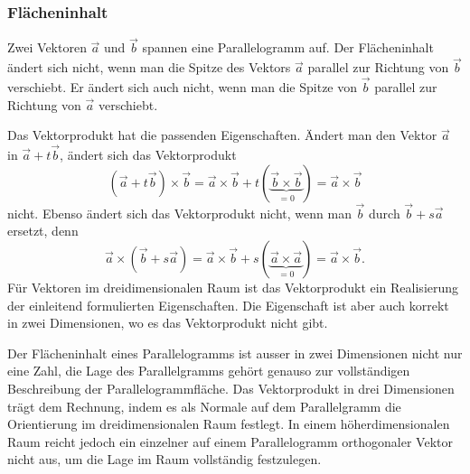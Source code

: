 %
%
\subsubsection{Flächeninhalt}

Zwei Vektoren $\vec{a}$ und $\vec{b}$ spannen eine Parallelogramm auf.
Der Flächeninhalt ändert sich nicht, wenn man die Spitze des Vektors
$\vec{a}$ parallel zur Richtung von $\vec{b}$ verschiebt.
Er ändert sich auch nicht, wenn man die Spitze von $\vec{b}$ parallel
zur Richtung von $\vec{a}$ verschiebt.

Das Vektorprodukt hat die passenden Eigenschaften.
Ändert man den Vektor $\vec{a}$ in $\vec{a}+t\vec{b}$, ändert sich das
Vektorprodukt
\begin{equation}
(\vec{a}+t\vec{b})\times\vec{b}
=
\vec{a}\times\vec{b} + t(\underbrace{\vec{b}\times\vec{b}}_{\displaystyle=0})
=
\vec{a}\times\vec{b}
\label{buch:green:2vektoren:eqn:parallelogramm1}
\end{equation}
nicht.
Ebenso ändert sich das Vektorprodukt nicht, wenn man $\vec{b}$ durch
$\vec{b}+s\vec{a}$ ersetzt, denn
\begin{equation}
\vec{a}\times(\vec{b}+s\vec{a})
=
\vec{a}\times\vec{b}
+
s(\underbrace{\vec{a}\times\vec{a}}_{\displaystyle=0})
=
\vec{a}\times\vec{b}.
\label{buch:green:2vektoren:eqn:parallelogramm2}
\end{equation}
Für Vektoren im dreidimensionalen Raum ist das Vektorprodukt ein 
Realisierung der einleitend formulierten Eigenschaften.
Die Eigenschaft ist aber auch korrekt in zwei Dimensionen, wo es
das Vektorprodukt nicht gibt.

Der Flächeninhalt eines Parallelogramms ist ausser in zwei Dimensionen
nicht nur eine Zahl, die Lage des Parallelgramms gehört genauso zur
vollständigen Beschreibung der Parallelogrammfläche.
Das Vektorprodukt in drei Dimensionen trägt dem Rechnung, indem
es als Normale auf dem Parallelgramm die Orientierung im dreidimensionalen
Raum festlegt.
In einem höherdimensionalen Raum reicht jedoch ein einzelner auf
einem Parallelogramm orthogonaler Vektor nicht aus, um die Lage im
Raum vollständig festzulegen.

